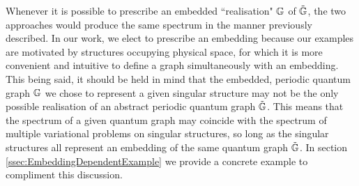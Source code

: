Whenever it is possible to prescribe an embedded ``realisation" $\mathbb{G}$ of $\tilde{\mathbb{G}}$, the two approaches would produce the same spectrum in the manner previously described.
In our work, we elect to prescribe an embedding because our examples are motivated by structures occupying physical space, for which it is more convenient and intuitive to define a graph simultaneously with an embedding.
This being said, it should be held in mind that the embedded, periodic quantum graph $\mathbb{G}$ we chose to represent a given singular structure may not be the only possible realisation of an abstract periodic quantum graph $\tilde{\mathbb{G}}$.
This means that the spectrum of a given quantum graph may coincide with the spectrum of multiple variational problems on singular structures, so long as the singular structures all represent an embedding of the same quantum graph $\tilde{\mathbb{G}}$.
In section \ref{ssec:EmbeddingDependentExample} we provide a concrete example to compliment this discussion.